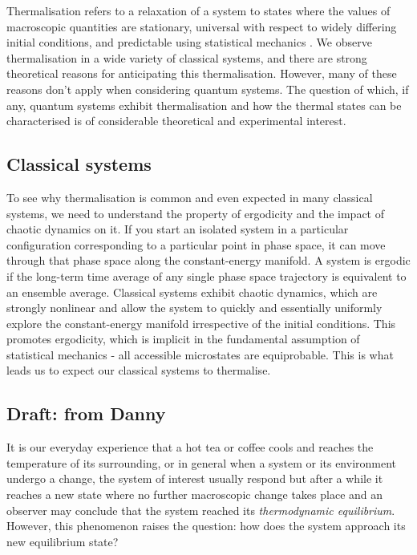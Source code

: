 \documentclass[a4paper, 10pt]{article}
\theoremstyle{plain}
\begin{document}
Thermalisation refers to a relaxation of a system to states where the values
of macroscopic quantities are stationary, universal with respect to widely
differing initial conditions, and predictable using statistical mechanics
\cite{Rigol2008}. We observe thermalisation in a wide variety of classical
systems, and there are strong theoretical reasons for anticipating this
thermalisation. However, many of these reasons don't apply when considering
quantum systems. The question of which, if any, quantum systems exhibit
thermalisation and how the thermal states can be characterised is of
considerable theoretical and experimental interest.

\subsection{Classical systems}

To see why thermalisation is common and even expected in many classical
systems, we need to understand the property of ergodicity and the impact of
chaotic dynamics on it. If you start an isolated system in a particular
configuration corresponding to a particular point in phase space, it can move
through that phase space along the constant-energy manifold. A system is
ergodic if the long-term time average of any single phase space trajectory
is equivalent to an ensemble average.  Classical systems
exhibit chaotic dynamics, which are strongly nonlinear and allow the system to
quickly and essentially uniformly explore the constant-energy manifold
irrespective of the initial conditions. This promotes ergodicity, which is
implicit in the fundamental assumption of statistical mechanics - all
accessible microstates are equiprobable.  This is what leads us to expect
our classical systems to thermalise.

\subsection{Draft: from Danny\label{DraftFromDanny}}

It is our everyday experience that a hot tea or coffee cools and reaches the
temperature of its surrounding, or in general when a system or its environment
undergo a change, the system of interest usually respond but after a while it
reaches a new state where no further macroscopic change takes place and an
observer may conclude that the system reached its {\emph{thermodynamic
equilibrium}}. However, this phenomenon raises the question: how does the system
approach its new equilibrium state?
\end{document}
